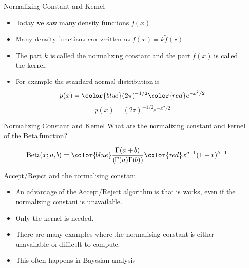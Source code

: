 \documentclass[10pt]{beamer}
\begin{document}
              \begin{frame}{Normalizing Constant and Kernel}
                \begin{itemize}
                \item Today we saw many density functions $f(x)$
                \item Many density functions can written as $f(x)=k\tilde{f}(x)$
                \item The part $k$ is called the {\color{blue} normalizing constant} and
                  the part $\tilde{f}(x)$ is called the {\color{red}
                    kernel}.
                \item For example the standard normal distribution is
                  {\begin{equation}
                      p(x)={\color{blue}(2\pi)^{-1/2}}{\color{red}e^{-x^2/2}}
                    \end{equation}}
                  {\begin{equation}
                      p(x)=(2\pi)^{-1/2}e^{-x^2/2}
                    \end{equation}}

                \end{itemize}
              \end{frame}
              \begin{frame}{Normalizing Constant and Kernel}
                What are the {\color{blue} normalizing constant}
                and
                {\color{red} kernel}
                of the Beta function?

                \begin{equation}
                  \mbox{Beta}(x;a,b)={\color{blue}\frac{\Gamma(a+b)}{(\Gamma(a)\Gamma(b))}}{\color{red}x^{a-1}(1-x)^{b-1}}
                \end{equation}

              \end{frame}
              \begin{frame}{Accept/Reject and the normalising constant}
                \begin{itemize}
                \item An advantage of the Accept/Reject algorithm is that is works, even if the normalizing constant is unavailable.

                \item Only the kernel is needed.

                \item There are many examples where the normalising constant is either unavailable or difficult to compute.

                \item This often happens in Bayesian analysis
                \end{itemize}
              \end{frame}
\end{document}

